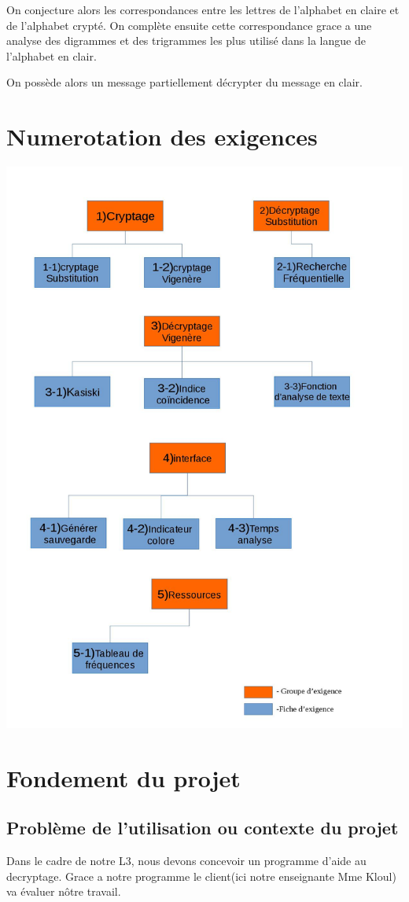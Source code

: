\documentclass[a4]{article}
\begin{document}
	On conjecture alors les correspondances entre les lettres de l’alphabet en claire et de l’alphabet crypté. On complète ensuite cette correspondance grace a une analyse des digrammes et des trigrammes les plus utilisé dans la langue de l’alphabet en clair.

On possède alors un message partiellement décrypter du message en clair.
	\section{Numerotation des exigences}
				\includegraphics[scale=0.31]{Arbre.jpg} 
		
	\section{Fondement du projet}
			\subsection{Problème de l'utilisation ou contexte du projet}
				Dans le cadre de notre L3, nous devons concevoir un programme d'aide au decryptage.
				Grace a notre programme le client(ici notre enseignante Mme Kloul) va évaluer nôtre travail.
\end{document}
